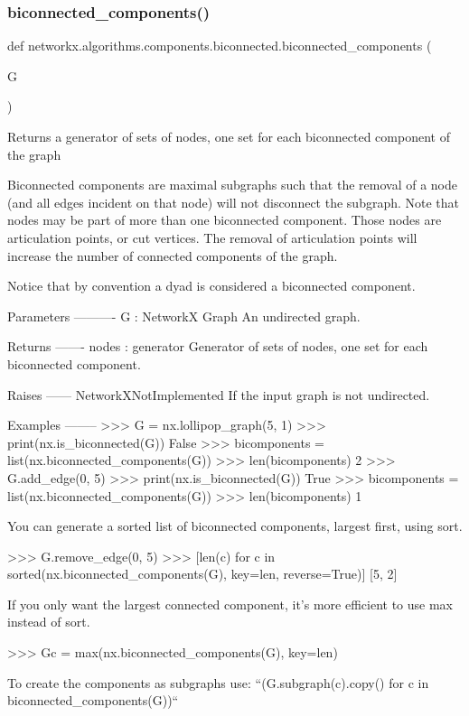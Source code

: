 \subsubsection{\texorpdfstring{biconnected\+\_\+components()}{biconnected\_components()}}
{\footnotesize\ttfamily def networkx.\+algorithms.\+components.\+biconnected.\+biconnected\+\_\+components (\begin{DoxyParamCaption}\item[{}]{G }\end{DoxyParamCaption})}

\begin{DoxyVerb}Returns a generator of sets of nodes, one set for each biconnected
component of the graph

Biconnected components are maximal subgraphs such that the removal of a
node (and all edges incident on that node) will not disconnect the
subgraph. Note that nodes may be part of more than one biconnected
component.  Those nodes are articulation points, or cut vertices.  The
removal of articulation points will increase the number of connected
components of the graph.

Notice that by convention a dyad is considered a biconnected component.

Parameters
----------
G : NetworkX Graph
    An undirected graph.

Returns
-------
nodes : generator
    Generator of sets of nodes, one set for each biconnected component.

Raises
------
NetworkXNotImplemented
    If the input graph is not undirected.

Examples
--------
>>> G = nx.lollipop_graph(5, 1)
>>> print(nx.is_biconnected(G))
False
>>> bicomponents = list(nx.biconnected_components(G))
>>> len(bicomponents)
2
>>> G.add_edge(0, 5)
>>> print(nx.is_biconnected(G))
True
>>> bicomponents = list(nx.biconnected_components(G))
>>> len(bicomponents)
1

You can generate a sorted list of biconnected components, largest
first, using sort.

>>> G.remove_edge(0, 5)
>>> [len(c) for c in sorted(nx.biconnected_components(G), key=len, reverse=True)]
[5, 2]

If you only want the largest connected component, it's more
efficient to use max instead of sort.

>>> Gc = max(nx.biconnected_components(G), key=len)

To create the components as subgraphs use:
``(G.subgraph(c).copy() for c in biconnected_components(G))``


\end{DoxyVerb}
